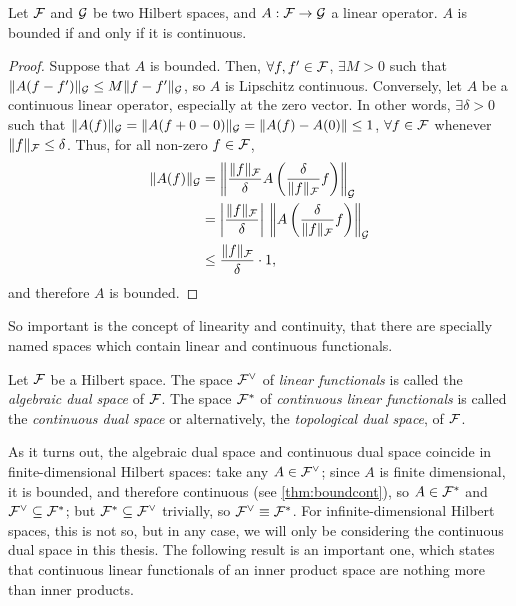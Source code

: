 \begin{lemma}\label{thm:boundcont}
  Let ${\mathcal F}$ and ${\mathcal G}$ be two Hilbert spaces, and $A:{\mathcal F}\to{\mathcal G}$ a linear operator.
  $A$ is bounded if and only if it is continuous.
\end{lemma}

\begin{proof}
  Suppose that $A$ is bounded.
  Then, $\forall f,f' \in {\mathcal F}$, $\exists M>0$ such that $\lVert A(f-f')\rVert_{\mathcal G} \leq M \lVert f-f'\rVert_{\mathcal G}$, so $A$ is Lipschitz continuous.
  Conversely, let $A$ be a continuous linear operator, especially at the zero vector.
  In other words, $\exists \delta > 0$ such that $\lVert A(f)\rVert_{\mathcal G} = \lVert A(f+0-0)\rVert_{\mathcal G} = \lVert A(f) - A(0)\rVert \leq 1$, $\forall f\in{\mathcal F}$ whenever $\lVert f\rVert_{\mathcal F} \leq \delta$.
  Thus, for all non-zero $f \in{\mathcal F}$,
  \begingroup
  \setlength{\abovedisplayskip}{7pt}
  \setlength{\belowdisplayskip}{7pt}
  \begin{align*}
    \lVert A(f)\rVert_{\mathcal G} &= \left\Vert \frac{\lVert f\rVert_{\mathcal F}}{\delta} A\left(\frac{\delta}{\lVert f\rVert_{\mathcal F}}f\right)\right\Vert_{\mathcal G} \\
    &= \left\vert \frac{\lVert f\rVert_{\mathcal F}}{\delta}\right\vert \, \left\Vert A\left(\frac{\delta}{\lVert f\rVert_{\mathcal F}}f\right)\right\Vert_{\mathcal G} \\    
    &\leq \frac{\lVert f\rVert_{\mathcal F}}{\delta} \cdot 1,
  \end{align*}
  \endgroup
  and therefore $A$ is bounded.
\end{proof}
\vspace{-0.5em}
So important is the concept of linearity and continuity, that there are specially named spaces which contain linear and continuous functionals.

\begin{definition}
  Let ${\mathcal F}$ be a Hilbert space. 
  The space ${\mathcal F}^\vee$ of \emph{linear functionals} is called the \emph{algebraic dual space} of ${\mathcal F}$.
  The space ${\mathcal F}^*$ of \emph{continuous linear functionals} is called the \emph{continuous dual space} or alternatively, the \emph{topological dual space}, of ${\mathcal F}$.   
\end{definition}

As it turns out, the algebraic dual space and continuous dual space coincide in finite-dimensional Hilbert spaces:
take any $A\in{\mathcal F}^\vee$; since $A$ is finite dimensional, it is bounded, and therefore continuous (see \cref{thm:boundcont}), so $A\in{\mathcal F}^*$ and ${\mathcal F}^\vee \subseteq {\mathcal F}^*$; but ${\mathcal F}^* \subseteq {\mathcal F}^\vee$ trivially, so ${\mathcal F}^\vee \equiv {\mathcal F}^*$.
For infinite-dimensional Hilbert spaces, this is not so, but in any case, we will only be considering the continuous dual space in this thesis.
The following result is an important one, which states that continuous linear functionals of an inner product space are nothing more than inner products.

